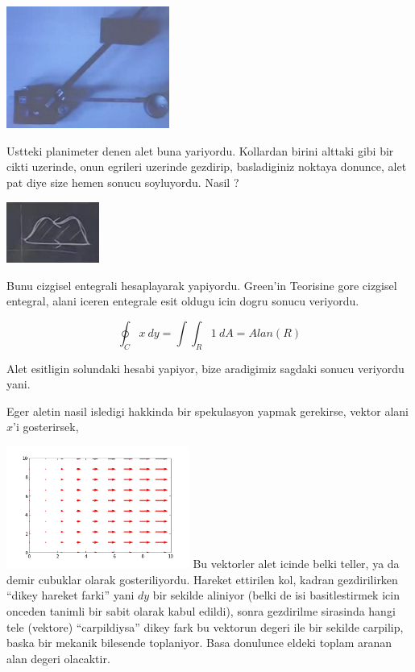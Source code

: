 \documentclass[12pt,fleqn]{article}
\begin{document}
\includegraphics[height=4cm]{22_9.png}

Ustteki planimeter denen alet buna yariyordu. Kollardan birini alttaki gibi
bir cikti uzerinde, onun egrileri uzerinde gezdirip, basladiginiz noktaya
donunce, alet pat diye size hemen sonucu soyluyordu. Nasil ?

\includegraphics[height=2cm]{22_10.png}

Bunu cizgisel entegrali hesaplayarak yapiyordu. Green'in Teorisine gore
cizgisel entegral, alani iceren entegrale esit oldugu icin dogru sonucu
veriyordu.

\[ \oint_C x \ dy  = \int \int_R 1 \ dA = Alan(R) \]

Alet esitligin solundaki hesabi yapiyor, bize aradigimiz sagdaki sonucu
veriyordu yani. 

Eger aletin nasil isledigi hakkinda bir spekulasyon yapmak gerekirse,
vektor alani $x$'i gosterirsek, 

\includegraphics[height=4cm]{field_x.png}
Bu vektorler alet icinde belki teller, ya da demir cubuklar olarak
gosteriliyordu. Hareket ettirilen kol, kadran gezdirilirken ``dikey hareket
farki'' yani $dy$ bir sekilde aliniyor (belki de isi basitlestirmek icin
onceden tanimli bir sabit olarak kabul edildi), sonra gezdirilme sirasinda
hangi tele (vektore) ``carpildiysa'' dikey fark bu vektorun degeri ile bir
sekilde carpilip, baska bir mekanik bilesende toplaniyor. Basa donulunce
eldeki toplam aranan alan degeri olacaktir. 
\end{document}

